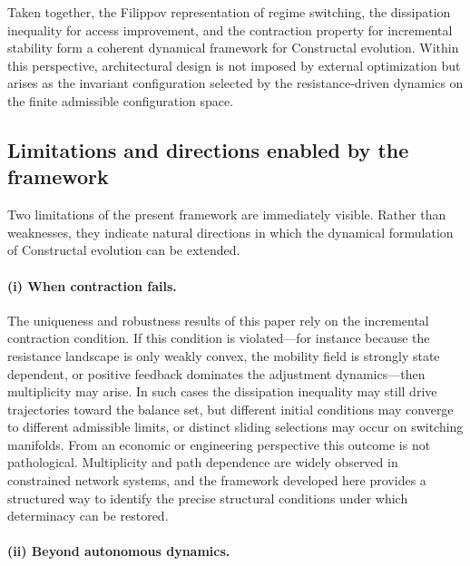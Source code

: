 \documentclass[12pt]{article}
\theoremstyle{plain}
\theoremstyle{definition}
\theoremstyle{remark}
\begin{document}
Taken together, the Filippov representation of regime switching,
the dissipation inequality for access improvement,
and the contraction property for incremental stability form a
coherent dynamical framework for Constructal evolution.
Within this perspective, architectural design is not imposed by
external optimization but arises as the invariant configuration
selected by the resistance-driven dynamics on the finite admissible
configuration space.



\subsection{Limitations and directions enabled by the framework}
\label{subsec:discussion_limitations}

Two limitations of the present framework are immediately visible.
Rather than weaknesses, they indicate natural directions in which
the dynamical formulation of Constructal evolution can be extended.

\paragraph{(i) When contraction fails.}

The uniqueness and robustness results of this paper rely on the
incremental contraction condition.
If this condition is violated---for instance because the resistance
landscape is only weakly convex, the mobility field is strongly
state dependent, or positive feedback dominates the adjustment
dynamics---then multiplicity may arise.
In such cases the dissipation inequality may still drive trajectories
toward the balance set, but different initial conditions may converge
to different admissible limits, or distinct sliding selections may
occur on switching manifolds.
From an economic or engineering perspective this outcome is not
pathological.
Multiplicity and path dependence are widely observed in constrained
network systems, and the framework developed here provides a
structured way to identify the precise structural conditions under
which determinacy can be restored.

\paragraph{(ii) Beyond autonomous dynamics.}
\end{document}

